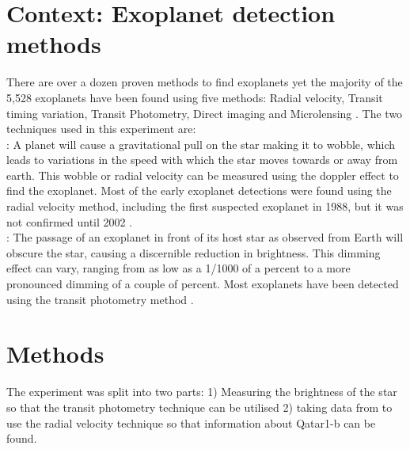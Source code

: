 \documentclass[10pt]{article}
\begin{document}
\section{Context: Exoplanet detection methods}
There are over a dozen proven methods to find exoplanets yet the majority of the 5,528 exoplanets have been found using five methods: Radial velocity, Transit timing variation, Transit Photometry, Direct imaging and Microlensing \cite{exoarchive}. The two techniques used in this experiment are:\\ : A planet will cause a gravitational pull on the star making it to wobble, which leads to variations in the speed with which the star moves towards or away from earth. This wobble or radial velocity can be measured using the doppler effect to find the exoplanet. Most of the early exoplanet detections were found using the radial velocity method, including the first suspected exoplanet in 1988, but it was not confirmed until 2002 \cite{hatzes2003}.\\ : The passage of an exoplanet in front of its host star as observed from Earth will obscure the star, causing a discernible reduction in brightness. This dimming effect can vary, ranging from as low as a 1/1000 of a percent to a more pronounced dimming of a couple of percent. Most exoplanets have been detected using the transit photometry method \cite{findplanet}.
\section{Methods}
The experiment was split into two parts: 1) Measuring the brightness of the star so that the transit photometry technique can be utilised 2) taking data from \cite{Alsubai_2011} to use the radial velocity technique so that information about Qatar1-b can be found.
\end{document}

